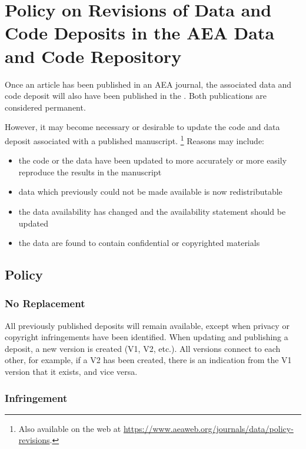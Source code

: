 \section{Policy on Revisions of Data and Code Deposits in the AEA Data and Code Repository}\label{policy-on-revisions-of-data-and-code-deposits-in-the-aea-data-and-code-repository}

Once an article has been published in an AEA journal, the associated
data and code deposit will also have been published in the
. Both publications are considered permanent.

However, it may become necessary or desirable to update the code and
data deposit associated with a published manuscript.%
\footnote{Also available on the web at \url{https://www.aeaweb.org/journals/data/policy-revisions}.} 
Reasons may
include:

\begin{itemize}
\tightlist
\item
  the code or the data have been updated to more accurately or more
  easily reproduce the results in the manuscript
\item
  data which previously could not be made available is now
  redistributable
\item
  the data availability has changed and the availability statement
  should be updated
\item
  the data are found to contain confidential or copyrighted materials
\end{itemize}

\subsection{Policy}\label{policy}

\subsubsection{No Replacement}\label{no-replacement}

All previously published deposits will remain available, except when
privacy or copyright infringements have been identified. When updating
and publishing a deposit, a new version is created (V1, V2, etc.). All
versions connect to each other, for example, if a V2 has been created,
there is an indication from the V1 version that it exists, and vice
versa.

\subsubsection{Infringement}\label{infringement}

